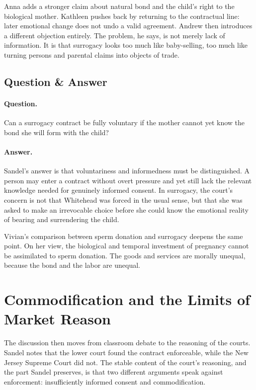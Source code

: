 Anna adds a stronger claim about natural bond and the child's right to the biological mother. Kathleen pushes back by returning to the contractual line: later emotional change does not undo a valid agreement. Andrew then introduces a different objection entirely. The problem, he says, is not merely lack of information. It is that surrogacy looks too much like baby-selling, too much like turning persons and parental claims into objects of trade.

\subsection{Question \& Answer}

\paragraph{Question.} Can a surrogacy contract be fully voluntary if the mother cannot yet know the bond she will form with the child?

\paragraph{Answer.} Sandel's answer is that voluntariness and informedness must be distinguished. A person may enter a contract without overt pressure and yet still lack the relevant knowledge needed for genuinely informed consent. In surrogacy, the court's concern is not that Whitehead was forced in the usual sense, but that she was asked to make an irrevocable choice before she could know the emotional reality of bearing and surrendering the child.

Vivian's comparison between sperm donation and surrogacy deepens the same point. On her view, the biological and temporal investment of pregnancy cannot be assimilated to sperm donation. The goods and services are morally unequal, because the bond and the labor are unequal.

\section{Commodification and the Limits of Market Reason}

The discussion then moves from classroom debate to the reasoning of the courts. Sandel notes that the lower court found the contract enforceable, while the New Jersey Supreme Court did not. The stable content of the court's reasoning, and the part Sandel preserves, is that two different arguments speak against enforcement: insufficiently informed consent and commodification.

